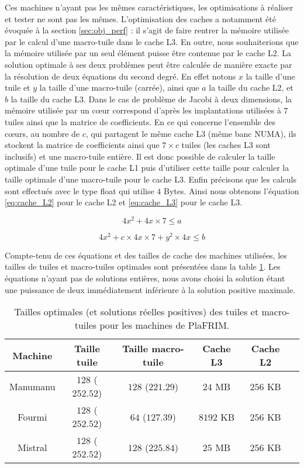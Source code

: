 Ces machines n'ayant pas les mêmes caractéristiques, les optimisations à réaliser et tester ne sont pas les mêmes. L'optimisation des caches a notamment été évoquée à la section \ref{sec:obj_perf} : il s'agit de faire rentrer la mémoire utilisée par le calcul d'une macro-tuile dans le cache L3. En outre, nous souhaiterions que la mémoire utilisée par un seul élément puisse être contenue par le cache L2. La solution optimale à ses deux problèmes peut être calculée de manière exacte par la résolution de deux équations du second degré. En effet notons $x$ la taille d'une tuile et $y$ la taille d'une macro-tuile (carrée), ainsi que $a$ la taille du cache L2, et $b$ la taille du cache L3. Dans le cas de problème de Jacobi à deux dimensions, la mémoire utilisée par un cœur correspond d'après les implantations utilisées à $7$ tuiles ainsi que la matrice de coefficients. En ce qui concerne l'ensemble des cœurs, au nombre de $c$, qui partagent le même cache L3 (même banc NUMA), ils stockent la matrice de coefficients ainsi que $7 \times c$ tuiles (les caches L3 sont inclusifs) et une macro-tuile entière. Il est donc possible de calculer la taille optimale d'une tuile pour le cache L1 puis d'utiliser cette taille pour calculer la taille optimale d'une macro-tuile pour le cache L3. Enfin précisons que les calculs sont effectués avec le type \textsf{float} qui utilise $4$ Bytes. Ainsi nous obtenons l'équation \ref{eq:cache_L2} pour le cache L2 et \ref{eq:cache_L3} pour le cache L3.

\begin{equation}
\label{eq:cache_L2}
4x^2 + 4x \times 7 \leq a
\end{equation}

\begin{equation}
\label{eq:cache_L3}
4x^2 + c \times 4x \times 7 + y^2 \times 4x \leq b
\end{equation}

Compte-tenu de ces équations et des tailles de cache des machines utilisées, les tailles de tuiles et macro-tuiles optimales sont présentées dans la table \ref{tab:size_cach}. Les équations n'ayant pas de solutions entières, nous avons choisi la solution étant une puissance de deux immédiatement inférieure à la solution positive maximale.

\begin{table}
{
\caption{Tailles optimales (et solutions réelles positives) des tuiles et macro-tuiles pour les machines de \textsf{PlaFRIM}.}
\label{tab:size_cach}
}
{
\begin{tabular}{||c||c|c|c|c|c||}
\hline
Machine & Taille tuile & Taille macro-tuile & Cache L3 & Cache L2 \\
\hline
\hline
Manumanu & $128$ ($252.52$) & $128$ ($221.29$) & $24$ MB & $256$ KB \\
Fourmi & $128$ ($252.52$) & $64$ ($127.39$) & $8192$ KB & $256$ KB \\
Mistral & $128$ ($252.52$) & $128$ ($225.84$) & $25$ MB & $256$ KB \\
\hline
\end{tabular}
}
\end{table} 


